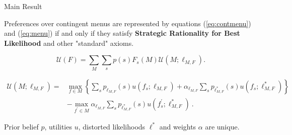 \documentclass[usenames,dvipsnames,aspectratio=169,11pt, envcountsect, handout]{beamer}
\begin{document}
\begin{frame}{Main Result}\label{mainresult}

	\begin{theorem}
		Preferences over contingent menus are represented by equations (\ref{eq:contmenu}) and (\ref{eq:menu}) if and only if they satisfy \textbf{Strategic Rationality for Best Likelihood} and other "standard" axioms.
	\end{theorem}

	\vfill

	\begin{equation}\label{eq:contmenu}
		\mathscr{U}(F)= \sum_{M} \sum_{s} p \left( s \right) F_{s} \left( M \right) \mathcal{U} \left(M ; \ell_{M, F} \right) .
	\end{equation}

	\vfill

	\begin{equation}\label{eq:menu}
		\begin{aligned}
			\mathcal{U} \left(M ; \ell_{M, F} \right) = & \max _{f \in M}\left\{\sum_{s} p_{\ell_{M, F}} \left( s \right) u \left( f_{s} ; \ell_{M, F} \right) + \alpha_{\ell_{M, F}} \sum_{s} p_{\ell^{*}_{M, F}} \left( s \right) u \left( f_{s} ; \ell^{*}_{M, F} \right) \right\} \\
			                                            & -\max _{f^{\prime} \in M} \alpha _{\ell_{M, F}} \sum_{s} p_{\ell^{*}_{M, F}} \left( s \right) u\left(f^{\prime}_{s} ; \ell^{*}_{M, F} \right) \: .
		\end{aligned}
	\end{equation}

	\vfill

	Prior belief \( p \), utilities \( u \), distorted likelihoods \( \ell^{*} \) and weights \( \alpha \) are unique. \hyperlink{axiomsb1main}{}

\end{frame}
\end{document}
